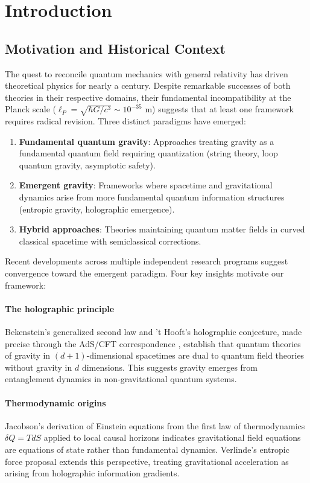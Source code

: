 \documentclass[11pt,a4paper]{article}
\theoremstyle{remark}
\theoremstyle{definition}
\begin{document}
\tableofcontents
\newpage

\section{Introduction}

\subsection{Motivation and Historical Context}

The quest to reconcile quantum mechanics with general relativity has driven theoretical physics for nearly a century. Despite remarkable successes of both theories in their respective domains, their fundamental incompatibility at the Planck scale ($\ell_P = \sqrt{\hbar G/c^3} \sim 10^{-35}$ m) suggests that at least one framework requires radical revision. Three distinct paradigms have emerged:

\begin{enumerate}
\item \textbf{Fundamental quantum gravity}: Approaches treating gravity as a fundamental quantum field requiring quantization (string theory, loop quantum gravity, asymptotic safety).
\item \textbf{Emergent gravity}: Frameworks where spacetime and gravitational dynamics arise from more fundamental quantum information structures (entropic gravity, holographic emergence).
\item \textbf{Hybrid approaches}: Theories maintaining quantum matter fields in curved classical spacetime with semiclassical corrections.
\end{enumerate}

Recent developments across multiple independent research programs suggest convergence toward the emergent paradigm. Four key insights motivate our framework:

\paragraph{The holographic principle} Bekenstein's generalized second law and 't Hooft's holographic conjecture, made precise through the AdS/CFT correspondence \cite{Maldacena1998}, establish that quantum theories of gravity in $(d+1)$-dimensional spacetimes are dual to quantum field theories without gravity in $d$ dimensions. This suggests gravity emerges from entanglement dynamics in non-gravitational quantum systems.

\paragraph{Thermodynamic origins} Jacobson's derivation \cite{Jacobson1995} of Einstein equations from the first law of thermodynamics $\delta Q = T dS$ applied to local causal horizons indicates gravitational field equations are equations of state rather than fundamental dynamics. Verlinde's entropic force proposal \cite{Verlinde2011} extends this perspective, treating gravitational acceleration as arising from holographic information gradients.
\end{document}
